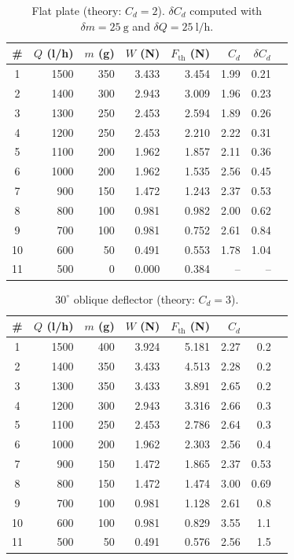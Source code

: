 \documentclass[11pt,a4paper]{article}
\numberwithin{equation}{section}
\newcommand{\Cd}{C_d}
\newcommand{\Fth}{F_{\mathrm{th}}}
\begin{document}
\begin{table}[htbp]
\centering
\small
\caption{Flat plate (theory: $\Cd=2$). $\delta\Cd$ computed with $\delta m=\SI{25}{\gram}$ and $\delta Q=\SI{25}{\litre\per\hour}$.}
\label{tab:flat}
\begin{tabular}{c r r r r r r r}
\toprule
\# & {$Q$ (l/h)} & {$m$ (g)} & {$W$ (N)} & {$\Fth$ (N)} & {$\Cd$} & {$\delta\Cd$}\\
\midrule
1 & 1500 & 350 & 3.433 & 3.454 & 1.99 & 0.21\\
2 & 1400 & 300 & 2.943 & 3.009 & 1.96 & 0.23\\
3 & 1300 & 250 & 2.453 & 2.594 & 1.89 & 0.26\\
4 & 1200 & 250 & 2.453 & 2.210 & 2.22 & 0.31 \\
5 & 1100 & 200 & 1.962 & 1.857 & 2.11 & 0.36 \\
6 & 1000 & 200 & 1.962 & 1.535 & 2.56 & 0.45\\
7 & 900 & 150 & 1.472 & 1.243 & 2.37 & 0.53 \\
8 & 800 & 100 & 0.981 & 0.982 & 2.00 & 0.62\\
9 & 700 & 100 & 0.981 & 0.752 & 2.61 & 0.84 \\
10 & 600 & 50 & 0.491 & 0.553 & 1.78 & 1.04\\
11 & 500 & 0 & 0.000 & 0.384 & -- & --  \\
\bottomrule
\end{tabular}
\end{table}

\begin{table}[htbp]
\centering
\small
\caption{$30^\circ$ oblique deflector (theory: $\Cd=3$).}
\label{tab:oblique}
\begin{tabular}{c r r r r r r r}
\toprule
\# & {$Q$ (l/h)} & {$m$ (g)} & {$W$ (N)} & {$\Fth$ (N)} & {$\Cd$} & {$\delta\Cd$\\
\midrule
1 & 1500 & 400 & 3.924 & 5.181 & 2.27 & 0.2\\
2 & 1400 & 350 & 3.433 & 4.513 & 2.28 & 0.2\\
3 & 1300 & 350 & 3.433 & 3.891 & 2.65 & 0.2 \\
4 & 1200 & 300 & 2.943 & 3.316 & 2.66 & 0.3 \\
5 & 1100 & 250 & 2.453 & 2.786 & 2.64 & 0.3 \\
6 & 1000 & 200 & 1.962 & 2.303 & 2.56 & 0.4 \\
7 & 900 & 150 & 1.472 & 1.865 & 2.37 & 0.53 \\
8 & 800 & 150 & 1.472 & 1.474 & 3.00 & 0.69\\
9 & 700 & 100 & 0.981 & 1.128 & 2.61 & 0.8 \\
10 & 600 & 100 & 0.981 & 0.829 & 3.55 & 1.1 \\
11 & 500 & 50 & 0.491 & 0.576 & 2.56 & 1.5 \\
\bottomrule
\end{tabular}
\end{table}
\end{document}
